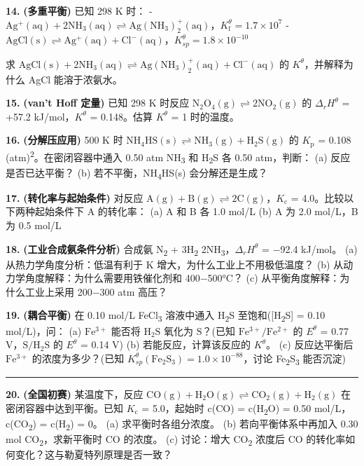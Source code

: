 \textbf{14.} \textbf{(多重平衡)} 已知 298 K 时：
- \(\mathrm{Ag^+(aq) + 2NH_3(aq) \rightleftharpoons Ag(NH_3)_2^+(aq)}\)，\(K_{\mathrm f}^\theta = 1.7 \times 10^7\)
- \(\mathrm{AgCl(s) \rightleftharpoons Ag^+(aq) + Cl^-(aq)}\)，\(K_{sp}^\theta = 1.8 \times 10^{-10}\)

求 \(\mathrm{AgCl(s) + 2NH_3(aq) \rightleftharpoons Ag(NH_3)_2^+(aq) + Cl^-(aq)}\) 的 \(K^\theta\)，并解释为什么 AgCl 能溶于浓氨水。

\textbf{15.} \textbf{(van't Hoff 定量)} 已知 298 K 时反应 \(\mathrm{N_2O_4(g) \rightleftharpoons 2NO_2(g)}\) 的 \(\Delta_r H^\theta\) = +57.2 kJ/mol，\(K^\theta\) = 0.148。估算 \(K^\theta\) = 1 时的温度。

\textbf{16.} \textbf{(分解压应用)} 500 K 时 \(\mathrm{NH_4HS(s) \rightleftharpoons NH_3(g) + H_2S(g)}\) 的 \(K_{\mathrm p}\) = 0.108 (atm)\textsuperscript{2}。在密闭容器中通入 0.50 atm NH\textsubscript{3} 和 H\textsubscript{2}S 各 0.50 atm，判断：
(a) 反应是否已达平衡？
(b) 若不平衡，NH\textsubscript{4}HS(s) 会分解还是生成？

\textbf{17.} \textbf{(转化率与起始条件)} 对反应 \(\mathrm{A(g) + B(g) \rightleftharpoons 2C(g)}\)，\(K_{\mathrm c}\) = 4.0。比较以下两种起始条件下 A 的转化率：
(a) A 和 B 各 1.0 mol/L
(b) A 为 2.0 mol/L，B 为 0.5 mol/L

\textbf{18.} \textbf{(工业合成氨条件分析)} 合成氨 N\textsubscript{2} + 3H\textsubscript{2} \衡 2NH\textsubscript{3}，\(\Delta_r H^\theta\) = −92.4 kJ/mol。
(a) 从热力学角度分析：低温有利于 K 增大，为什么工业上不用极低温度？
(b) 从动力学角度解释：为什么需要用铁催化剂和 400−500°C？
(c) 从平衡角度解释：为什么工业上采用 200−300 atm 高压？

\textbf{19.} \textbf{(耦合平衡)} 在 0.10 mol/L FeCl\textsubscript{3} 溶液中通入 H\textsubscript{2}S 至饱和({[}H\textsubscript{2}S{]} = 0.10 mol/L)，问：
(a) \(\mathrm{Fe^{3+}}\) 能否将 \(\mathrm{H_2S}\) 氧化为 \(\mathrm{S}\)？(已知 \(\mathrm{Fe^{3+}/Fe^{2+}}\) 的 \(E^\theta\) = 0.77 V，\(\mathrm{S/H_2S}\) 的 \(E^\theta\) = 0.14 V)
(b) 若能反应，计算该反应的 \(K^\theta\)。
(c) 反应达平衡后 \(\mathrm{Fe^{3+}}\) 的浓度为多少？(已知 \(K_{sp}^\theta(\mathrm{Fe_2S_3}) = 1.0 \times 10^{-88}\)，讨论 Fe\textsubscript{2}S\textsubscript{3} 能否沉淀)

\begin{center}\rule{0.5\linewidth}{0.5pt}\end{center}

\textbf{20.} \textbf{(全国初赛)} 某温度下，反应 \(\mathrm{CO(g) + H_2O(g) \rightleftharpoons CO_2(g) + H_2(g)}\) 在密闭容器中达到平衡。已知 \(K_{\mathrm c}\) = 5.0，起始时 c(CO) = c(H\textsubscript{2}O) = 0.50 mol/L，c(CO\textsubscript{2}) = c(H\textsubscript{2}) = 0。
(a) 求平衡时各组分浓度。
(b) 若向平衡体系中再加入 0.30 mol CO\textsubscript{2}，求新平衡时 CO 的浓度。
(c) 讨论：增大 CO\textsubscript{2} 浓度后 CO 的转化率如何变化？这与勒夏特列原理是否一致？

